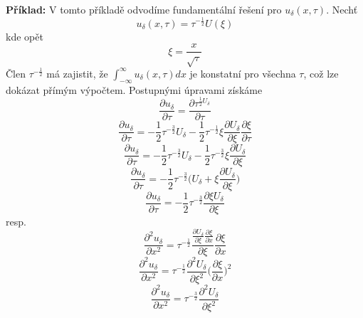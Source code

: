 \documentclass[a4paper]{book}
\begin{document}
\noindent \textbf{Příklad:} V tomto příkladě odvodíme fundamentální řešení pro $u_{\delta}(x, \tau)$. Nechť
\begin{equation*}
u_{\delta}(x, \tau) = \tau^{-\frac{1}{2}}U(\xi)
\end{equation*}
kde opět
\begin{equation*}
\xi = \frac{x}{\sqrt{\tau}}
\end{equation*}
Člen $\tau^{-\frac{1}{2}}$ má zajistit, že $\int^{\infty}_{-\infty}u_{\delta}(x,\tau)dx$ je konstatní pro všechna $\tau$, což lze dokázat přímým výpočtem. Postupnými úpravami získáme
\begin{equation*}
\frac{\partial u_{\delta}}{\partial \tau} = \frac{\partial \tau^{\frac{1}{2}U_{\delta}}}{\partial \tau}
\end{equation*}
\begin{equation*}
\frac{\partial u_{\delta}}{\partial \tau} = -\frac{1}{2}\tau^{-\frac{3}{2}}U_{\delta} - \frac{1}{2}\tau^{-\frac{1}{2}} \xi \frac{\partial U_{\delta}}{\partial \xi}\frac{\partial \xi}{\partial \tau}
\end{equation*}
\begin{equation*}
\frac{\partial u_{\delta}}{\partial \tau} = -\frac{1}{2}\tau^{-\frac{3}{2}}U_{\delta} - \frac{1}{2}\tau^{-\frac{3}{2}} \xi \frac{\partial U_{\delta}}{\partial \xi}
\end{equation*}
\begin{equation*}
\frac{\partial u_{\delta}}{\partial \tau} = -\frac{1}{2}\tau^{-\frac{3}{2}} \bigg( U_{\delta} + \xi \frac{\partial U_{\delta}}{\partial \xi} \bigg)
\end{equation*}
\begin{equation*}
\frac{\partial u_{\delta}}{\partial \tau} = -\frac{1}{2}\tau^{-\frac{3}{2}} \frac{\partial \xi U_{\delta}}{\partial \xi}
\end{equation*}
resp.
\begin{equation*}
\frac{\partial^2 u_{\delta}}{\partial x^2} = \tau^{-\frac{1}{2}}\frac{\frac{\partial U_{\delta}}{\partial \xi} \frac{\partial \xi}{\partial x}}{\partial \xi} \frac{\partial \xi}{\partial x}
\end{equation*}
\begin{equation*}
\frac{\partial^2 u_{\delta}}{\partial x^2} = \tau^{-\frac{1}{2}}\frac{\partial^2 U_{\delta}}{\partial \xi^2} \bigg( \frac{\partial \xi}{\partial x} \bigg)^2
\end{equation*}
\begin{equation*}
\frac{\partial^2 u_{\delta}}{\partial x^2} = \tau^{-\frac{3}{2}}\frac{\partial^2 U_{\delta}}{\partial \xi^2}
\end{equation*}
\end{document}
